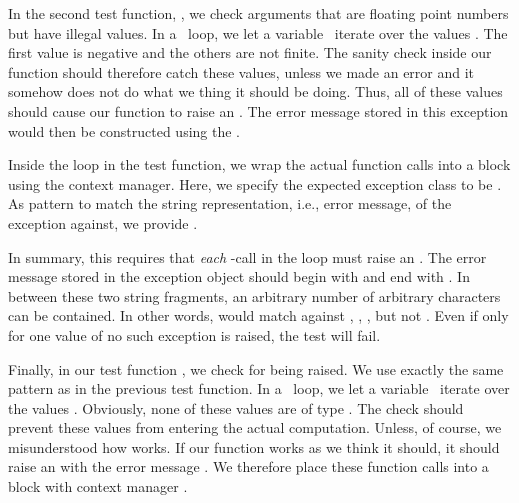 In the second test function, , we check arguments that are floating point numbers but have illegal values.
In a ~loop, we let a variable~ iterate over the values .
The first value is negative and the others are not finite.
The sanity check  inside our function should therefore catch these values, unless we made an error and it somehow does not do what we thing it should be doing.
Thus, all of these values should cause our  function to raise an .
The error message stored in this exception would then be constructed using the  .

Inside the loop in the test function, we wrap the actual function calls into a  block using the  context manager.
Here, we specify the expected exception class to be .
As pattern to match the string representation, i.e., error message, of the exception against, we provide .
%
\begin{sloppypar}%
In summary, this requires that \emph{each} -call in the loop must raise an .
The error message stored in the exception object should begin with  and end with .
In between these two string fragments, an arbitrary number of arbitrary characters can be contained.
In other words,  would match against , , , but not .
Even if only for one value of  no such exception is raised, the test will fail.%
\end{sloppypar}%
%
\begin{sloppypar}%
Finally, in our test function , we check for  being raised.
We use exactly the same pattern as in the previous test function.
In a ~loop, we let a variable~ iterate over the values .
Obviously, none of these values are of type .
The check  should prevent these values from entering the actual computation.
Unless, of course, we misunderstood how  works.
If our function  works as we think it should, it should raise an  with the error message .
We therefore place these function calls into a  block with context manager .
\end{sloppypar}%
